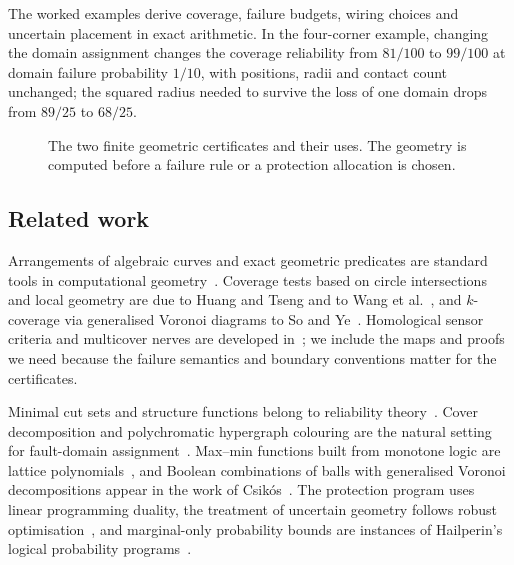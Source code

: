 The worked examples derive coverage, failure budgets, wiring choices and uncertain placement in exact arithmetic. In the four-corner example, changing the domain assignment changes the coverage reliability from $81/100$ to $99/100$ at domain failure probability $1/10$, with positions, radii and contact count unchanged; the squared radius needed to survive the loss of one domain drops from $89/25$ to $68/25$.

\begin{figure}[tb]
\centering
{}
\caption{The two finite geometric certificates and their uses. The geometry is computed before a failure rule or a protection allocation is chosen.}
\end{figure}

\subsection{Related work}
Arrangements of algebraic curves and exact geometric predicates are standard tools in computational geometry~\cite{arrangements}. Coverage tests based on circle intersections and local geometry are due to Huang and Tseng and to Wang et al.~\cite{coverage2003,integrated}, and $k$-coverage via generalised Voronoi diagrams to So and Ye~\cite{soye}. Homological sensor criteria and multicover nerves are developed in~\cite{ghrist,desilva,controlled,sheehy,corbet,alonso}; we include the maps and proofs we need because the failure semantics and boundary conventions matter for the certificates.

Minimal cut sets and structure functions belong to reliability theory~\cite{barlow}. Cover decomposition and polychromatic hypergraph colouring are the natural setting for fault-domain assignment~\cite{polychromatic}. Max--min functions built from monotone logic are lattice polynomials~\cite{lattice,reliability-lattice}, and Boolean combinations of balls with generalised Voronoi decompositions appear in the work of Csik\'os~\cite{csikos}. The protection program uses linear programming duality, the treatment of uncertain geometry follows robust optimisation~\cite{robustbook}, and marginal-only probability bounds are instances of Hailperin's logical probability programs~\cite{hailperin}.

